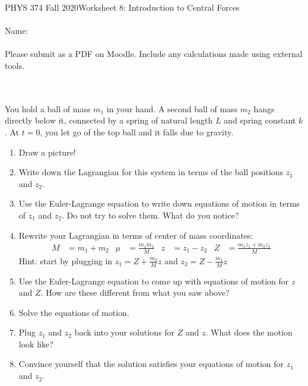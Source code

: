 \documentclass[12pt]{article}
\newcommand{\varz}{z}
\begin{document}
PHYS 374 Fall 2020\hfill Worksheet 8: Introduction to Central Forces\\
\\
Name:\\
\\
Please submit as a PDF on Moodle. Include any calculations made using external tools.

\hrulefill
\\
\\
You hold a ball of mass $m_1$ in your hand. A second ball of mass $m_2$ hangs directly below it, connected by a spring of natural length $L$ and spring constant $k$. At $t=0$, you let go of the top ball and it falls due to gravity. 

\begin{enumerate}
    \item Draw a picture!
    \item Write down the Lagrangian for this system in terms of the ball positions $z_1$ and $z_2$. 
    \item Use the Euler-Lagrange equation to write down equations of motion in terms of $z_1$ and $z_2$. Do not try to solve them. What do you notice?
    \item Rewrite your Lagrangian in terms of center of mass coordinates:
    \begin{align*}
        M &= m_1 + m_2 & 
        \mu &= \frac{m_1 m_2}{M} &
        \varz &= z_1 - z_2 &
        Z &= \frac{m_1 z_1 + m_2 z_2}{M}
    \end{align*}
    Hint: start by plugging in $z_1 = Z + \tfrac{m_2}{M} \varz$ and $z_2 = Z - \tfrac{m_1}{M} \varz$
    \item Use the Euler-Lagrange equation to come up with equations of motion for $\varz$ and $Z$. How are these different from what you saw above?
    \item Solve the equations of motion.
    \item Plug $z_1$ and $z_2$ back into your solutions for $Z$ and $\varz$. What does the motion look like?
    \item Convince yourself that the solution satisfies your equations of motion for $z_1$ and $z_2$.
\end{enumerate}
\end{document}
